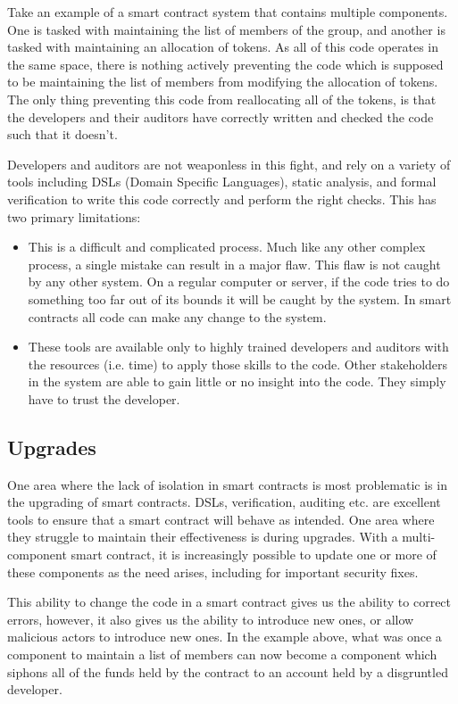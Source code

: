 \documentclass[english,a4paper]{article}
\begin{document}
Take an example of a smart contract system that contains multiple components.
One is tasked with maintaining the list of members of the group, and another is
tasked with maintaining an allocation of tokens. As all of this code operates in
the same space, there is nothing actively preventing the code which is supposed
to be maintaining the list of members from modifying the allocation of tokens.
The only thing preventing this code from reallocating all of the tokens, is that
the developers and their auditors have correctly written and checked the code
such that it doesn't.

Developers and auditors are not weaponless in this fight, and rely on a variety
of tools including DSLs (Domain Specific Languages), static analysis, and formal
verification to write this code correctly and perform the right checks. This has
two primary limitations:

\begin{itemize}
  \item This is a difficult and complicated process. Much like any other complex
  process, a single mistake can result in a major flaw. This flaw is not caught
  by any other system. On a regular computer or server, if the code tries to do
  something too far out of its bounds it will be caught by the system. In smart
  contracts all code can make any change to the system.
  \item These tools are available only to highly trained developers and auditors
  with the resources (i.e. time) to apply those skills to the code. Other
  stakeholders in the system are able to gain little or no insight into the
  code. They simply have to trust the developer.
\end{itemize}

\subsection{Upgrades}\label{upgrades}
One area where the lack of isolation in smart contracts is most problematic is
in the upgrading of smart contracts. DSLs, verification, auditing etc. are
excellent tools to ensure that a smart contract will behave as intended. One
area where they struggle to maintain their effectiveness is during upgrades.
With a multi-component smart contract, it is increasingly possible to update one
or more of these components as the need arises, including for important security
fixes.

This ability to change the code in a smart contract gives us the ability to
correct errors, however, it also gives us the ability to introduce new ones, or
allow malicious actors to introduce new ones. In the example above, what was
once a component to maintain a list of members can now become a component which
siphons all of the funds held by the contract to an account held by a
disgruntled developer.
\end{document}
